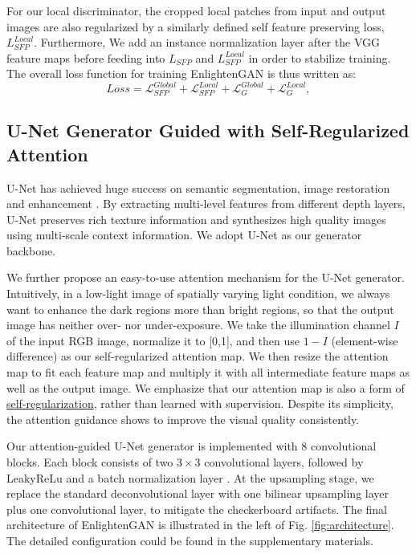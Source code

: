 \documentclass[journal]{IEEEtran}
\begin{document}
For our local discriminator, the cropped local patches from input and output images are also regularized by a similarly defined self feature preserving loss, $L_{SFP}^{Local}$. 
Furthermore, We add an instance normalization layer \cite{ulyanov2017improved} after the VGG feature maps before feeding into $L_{SFP}$ and $L_{SFP}^{Local}$ in order to stabilize training. The overall loss function for training EnlightenGAN is thus written as:
\begin{equation}
Loss = \mathcal{L}_{SFP}^{Global} + \mathcal{L}_{SFP}^{Local} + \mathcal{L}_G^{Global} + \mathcal{L}_G^{Local},
\end{equation}


\subsection{U-Net Generator Guided with Self-Regularized Attention}
U-Net \cite{ronneberger2015u} has achieved huge success on semantic segmentation, image restoration and enhancement \cite{liu2018image}. By extracting multi-level features from different depth layers, U-Net preserves rich texture information and synthesizes high quality images using multi-scale context information. We adopt U-Net as our generator backbone.

We further propose an easy-to-use attention mechanism for the U-Net generator. Intuitively, in a low-light image of spatially varying light condition, we always want to enhance the dark regions more than bright regions, so that the output image has neither over- nor under-exposure. 
We take the illumination channel $I$ of the input RGB image, normalize it to [0,1], and then use $1-I$ (element-wise difference) as our self-regularized attention map. 
We then resize the attention map to fit each feature map and multiply it with all intermediate feature maps as well as the output image. We emphasize that our attention map is also a form of \underline{self-regularization}, rather than learned with supervision. Despite its simplicity, the attention guidance shows to improve the visual quality consistently. 


Our attention-guided U-Net generator is implemented with 8 convolutional blocks. Each block consists of 
two $3 \times 3$ convolutional layers, followed by LeakyReLu and a batch normalization layer \cite{ioffe2015batch}. At the upsampling stage, we replace the standard deconvolutional layer with one bilinear upsampling layer plus one convolutional layer, to mitigate the checkerboard artifacts. The final architecture of EnlightenGAN is illustrated in the left of Fig. \ref{fig:architecture}. The detailed configuration could be found in the supplementary materials. 
\end{document}
